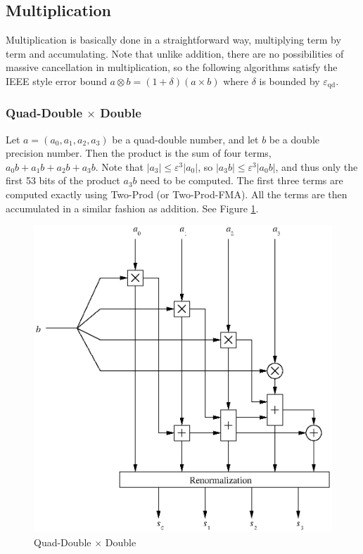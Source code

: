 \documentclass[11pt]{article}
\theoremstyle{definition}
\newcommand{\eps}{\varepsilon}
\newcommand{\epsqd}{\varepsilon_\mathrm{qd}}
\begin{document}
\subsection{Multiplication}
Multiplication is basically done in a straightforward way, multiplying
term by term and accumulating.  Note that unlike addition, there
are no possibilities of massive cancellation in multiplication, so
the following algorithms satisfy the IEEE style error bound
$a \otimes b = (1 + \delta)(a \times b)$ where $\delta$ is bounded
by $\epsqd$.

\subsubsection{Quad-Double $\times$ Double}
Let $a = (a_0, a_1, a_2, a_3)$ be a quad-double number, and let $b$ be
a double precision number.  Then the product is the sum of four terms, 
$a_0 b + a_1 b + a_2 b + a_3 b$.  Note that $|a_3| \le \eps^3 |a_0|$, 
so $|a_3 b| \le \eps^3 |a_0 b|$, and thus only the first 53 bits of
the product $a_3 b$ need to be computed.  The first three terms are
computed exactly using {\sc Two-Prod} (or {\sc Two-Prod-FMA}).
All the terms are then accumulated in a similar fashion as addition.
See Figure \ref{qd_mul_qd_d_fig}.

\begin{figure}
  \begin{center} 
    \includegraphics{qd_mul_qd_d.eps}
    \caption{\label{qd_mul_qd_d_fig}Quad-Double $\times$ Double}
  \end{center}
\end{figure}
\end{document}
